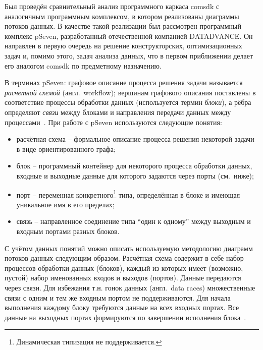 Был проведён сравнительный анализ программного каркаса comsdk с аналогичным программным комплексом, в котором реализованы диаграммы потоков данных. В качестве такой реализации был рассмотрен программный комплекс pSeven, разработанный отечественной компанией DATADVANCE. Он направлен в первую очередь на решение конструкторских, оптимизационных задач и, помимо этого, задач анализа данных, что в первом приближении делает его аналогом comsdk по предметному назначению.

В терминах \textsf{pSeven}: графовое описание процесса решения задачи называется \textit{расчетной схемой} (англ.~workflow); вершинам графового описания поставлены в соответствие процессы обработки данных (используется термин \textit{блоки}), а рёбра определяют \textit{связи} между блоками и направления передачи данных между процессами~\cite{NazarenkoDFM2015}. При работе с pSeven используются следующие понятия:
\begin{itemize}
  \item \textsf{расчётная схема} -- формальное описание процесса решения некоторой задачи в виде ориентированного графа;
  \item \textsf{блок} -- программный контейнер для некоторого процесса обработки данных, входные и выходные данные для которого задаются через порты (см.~ниже);
  \item \textsf{порт} -- переменная конкретного\footnote{Динамическая типизация не поддерживается.} типа, определённая в блоке и имеющая уникальное имя в его пределах;
  \item \textsf{связь} -- направленное соединение типа ``один к одному'' между выходным и входным портами разных блоков.
\end{itemize}

С учётом данных понятий можно описать используемую методологию диаграмм потоков данных следующим образом. Расчётная схема содержит в себе набор процессов обработки данных (блоков), каждый из которых имеет (возможно, пустой) набор именованных входов и выходов (портов). Данные передаются через связи. Для избежания т.н. гонок данных (англ.~data races) множественные связи с одним и тем же входным портом не поддерживаются. Для начала выполнения каждому блоку требуются данные на всех входных портах. Все данные на выходных портах формируются по завершении исполнения блока~\cite{NazarenkoDFM2015}.

